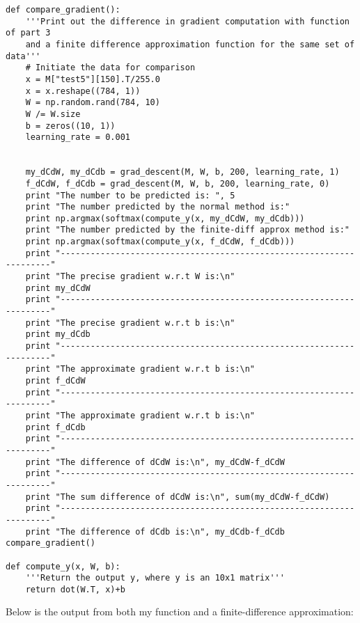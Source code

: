 \documentclass{article}
\begin{document}
\begin{lstlisting}
def compare_gradient():
    '''Print out the difference in gradient computation with function of part 3 
    and a finite difference approximation function for the same set of data'''
    # Initiate the data for comparison
    x = M["test5"][150].T/255.0
    x = x.reshape((784, 1))
    W = np.random.rand(784, 10)
    W /= W.size
    b = zeros((10, 1))
    learning_rate = 0.001


    my_dCdW, my_dCdb = grad_descent(M, W, b, 200, learning_rate, 1)
    f_dCdW, f_dCdb = grad_descent(M, W, b, 200, learning_rate, 0)
    print "The number to be predicted is: ", 5
    print "The number predicted by the normal method is:"
    print np.argmax(softmax(compute_y(x, my_dCdW, my_dCdb)))
    print "The number predicted by the finite-diff approx method is:"
    print np.argmax(softmax(compute_y(x, f_dCdW, f_dCdb)))
    print "--------------------------------------------------------------------"
    print "The precise gradient w.r.t W is:\n"
    print my_dCdW
    print "--------------------------------------------------------------------"
    print "The precise gradient w.r.t b is:\n"
    print my_dCdb
    print "--------------------------------------------------------------------"
    print "The approximate gradient w.r.t b is:\n"
    print f_dCdW
    print "--------------------------------------------------------------------"
    print "The approximate gradient w.r.t b is:\n"
    print f_dCdb
    print "--------------------------------------------------------------------"
    print "The difference of dCdW is:\n", my_dCdW-f_dCdW
    print "--------------------------------------------------------------------"
    print "The sum difference of dCdW is:\n", sum(my_dCdW-f_dCdW)
    print "--------------------------------------------------------------------"
    print "The difference of dCdb is:\n", my_dCdb-f_dCdb
compare_gradient() 

def compute_y(x, W, b):
    '''Return the output y, where y is an 10x1 matrix'''
    return dot(W.T, x)+b
\end{lstlisting}
Below is the output from both my function and a finite-difference approximation:\\
\end{document}
